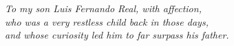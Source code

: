 \thispagestyle{empty}
\vspace*{6.5cm}

\begin{flushright}
\begin{minipage}{0.85\textwidth}
\raggedleft
\itshape\fontsize{11}{17}\selectfont
To my son Luis Fernando Real, with affection,\\
who was a very restless child back in those days,\\
and whose curiosity led him to far surpass his father.
\end{minipage}
\end{flushright}

\vfill
